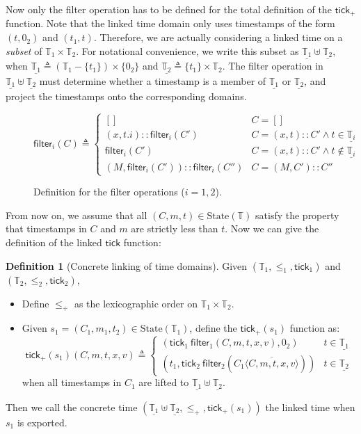 \documentclass[acmsmall,review]{acmart}\settopmatter{printfolios=true,printccs=false,printacmref=false}
\theoremstyle{definition}
\newtheorem{definition}{Definition}[section]
\newcommand*{\cons}{::}
\newcommand*{\Time}{\mathbb{T}}
\newcommand*{\mem}{m}
\newcommand*{\State}[1]{\text{State}({#1})}
\newcommand*{\tick}{\mathsf{tick}}
\newcommand*{\delete}[2]{{#1}\overline{\langle{#2}\rangle}}
\newcommand*{\filter}{\mathsf{filter}}
\begin{document}
Now only the filter operation has to be defined for the total definition of the $\tick_+$ function.
Note that the linked time domain only uses timestamps of the form $(t,0_2)$ and $(t_1,t)$.
Therefore, we are actually considering a linked time on a \emph{subset} of $\Time_1\times\Time_2$.
For notational convenience, we write this subset as $\underline{\Time_1}\uplus\underline{\Time_2}$, when $\underline{\Time_1}\triangleq(\Time_1-\{t_1\})\times\{0_2\}$ and $\underline{\Time_2}\triangleq\{t_1\}\times\Time_2$.
The filter operation in $\underline{\Time_1}\uplus\underline{\Time_2}$ must determine whether a timestamp is a member of $\underline{\Time_1}$ or $\underline{\Time_2}$, and project the timestamps onto the corresponding domains.
\begin{figure}[h!]
  \footnotesize
  \[
    \filter_i(C)\triangleq
    \begin{cases}
      []                                   & C=[]                                              \\
      (x,t.i)\cons\filter_i(C')            & C=(x,t)\cons C'\wedge t\in\underline{\Time_i}     \\
      \filter_i(C')                        & C=(x,t)\cons C'\wedge t\not\in\underline{\Time_i} \\
      (M,\filter_i(C'))\cons\filter_i(C'') & C=(M, C')\cons C''
    \end{cases}
  \]
  \caption{Definition for the filter operations ($i=1,2$).}
  \label{fig:concfilter}
\end{figure}

From now on, we assume that all $(C,\mem,t)\in\State{\Time}$ satisfy the property that timestamps in $C$ and $\mem$ are strictly less than $t$.
Now we can give the definition of the linked $\tick$ function:
\begin{definition}[Concrete linking of time domains]
  Given $(\Time_1,\le_1,\tick_1)$ and $(\Time_2,\le_2,\tick_2)$,

  \begin{itemize}
    \item Define $\le_+$ as the lexicographic order on $\Time_1\times\Time_2$.
    \item Given $s_1=(C_1,\mem_1,t_2)\in\State{\Time_1}$, define the ${\tick_{+}}({s_1})$ function as:
          \[
            \tick_{+}({s_1})({C},\mem,{t},x,{v})\triangleq
            \begin{cases}
              (\tick_1\:\filter_1(C,\mem,t,x,v), 0_2)                     & t\in\underline{\Time_1} \\
              (t_1,\tick_2\:\filter_2(\delete{{C_1}}{C,\mem, {t},x,{v}})) & t\in\underline{\Time_2}
            \end{cases}
          \]
          when all timestamps in $C_1$ are lifted to $\underline{\Time_1}\uplus\underline{\Time_2}$.
  \end{itemize}

  Then we call the concrete time $(\underline{\Time_1}\uplus\underline{\Time_2},\le_+,\tick_{+}({s_1}))$ the linked time when $s_1$ is exported.
\end{definition}
\end{document}
